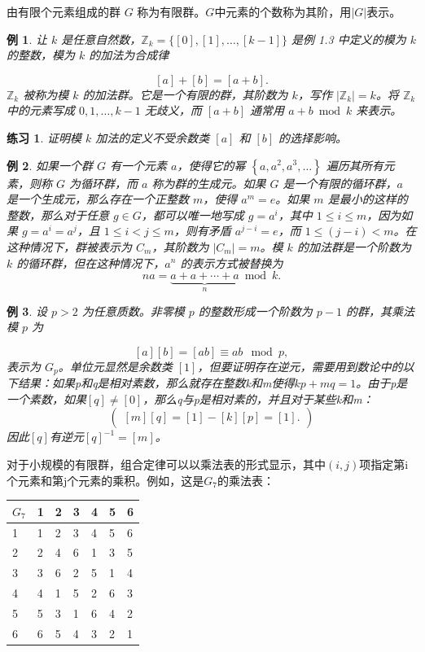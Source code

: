 \documentclass[hyperref,UTF8]{ctexbook}
\newtheorem{eg}{例}[chapter]
\newtheorem*{exercise}{练习}
\begin{document}
由有限个元素组成的群 $G$ 称为有限群。$G$中元素的个数称为其阶，用$|G|$表示。
\begin{eg}
    让 $k$ 是任意自然数，$\mathbb{Z}_k=\{[0],[1],\ldots,[k-1]\}$ 是例 1.3 中定义的模为 $k$ 的整数，模为 $k$ 的加法为合成律

$$
[a]+[b]=[a+b] .
$$
$\mathbb{Z}_k$ 被称为模 $k$ 的加法群。它是一个有限的群，其阶数为 $k$，写作 $\left|\mathbb{Z}_k\right|=k$。将 $\mathbb{Z}_k$ 中的元素写成 $0,1, \ldots, k-1$ 无歧义，而 $[a+b]$ 通常用 $a+b \bmod k$ 来表示。
\end{eg}
\begin{exercise}
    证明模 $k$ 加法的定义不受余数类 $[a]$ 和 $[b]$ 的选择影响。
\end{exercise}
\begin{eg}
 如果一个群 $G$ 有一个元素 $a$，使得它的幂 $\left\{a, a^2, a^3, \ldots\right\}$ 遍历其所有元素，则称 $G$ 为循环群，而 $a$ 称为群的生成元。如果 $G$ 是一个有限的循环群，$a$ 是一个生成元，那么存在一个正整数 $m$，使得 $a^m=e$。如果 $m$ 是最小的这样的整数，那么对于任意 $g \in G$，都可以唯一地写成 $g=a^i$，其中 $1 \leq i \leq m$，因为如果 $g=a^i=a^j$，且 $1 \leq i<j \leq m$，则有矛盾 $a^{j-i}=e$，而 $1 \leq(j-i)<m$。在这种情况下，群被表示为 $C_m$，其阶数为 $\left|C_m\right|=m$。模 $k$ 的加法群是一个阶数为 $k$ 的循环群，但在这种情况下，$a^n$ 的表示方式被替换为
$$
n a=\underbrace{a+a+\cdots+a}_{n} \bmod k .
$$ 
\end{eg}
\begin{eg}
    设 $p>2$ 为任意质数。非零模 $p$ 的整数形成一个阶数为 $p-1$ 的群，其乘法模 $p$ 为

$$
[a][b]=[ab]\equiv ab\mod p,
$$
表示为 $G_p$。单位元显然是余数类 $[1]$，但要证明存在逆元，需要用到数论中的以下结果：如果p和q是相对素数，那么就存在整数k和m使得$k p+m q=1$。由于p是一个素数，如果$[q] \neq[0]$，那么q与p是相对素的，并且对于某些k和m：
$$
\begin{pmatrix}
[m][q]=[1]-[k][p]=[1] .
\end{pmatrix}
$$
因此$[q]$有逆元$[q]^{-1}=[m]$。
\end{eg} 
对于小规模的有限群，组合定律可以以乘法表的形式显示，其中$(i, j)$项指定第i个元素和第j个元素的乘积。例如，这是$G_7$的乘法表：

\begin{tabular}{l|llllll}
$G_7$ & 1 & 2 & 3 & 4 & 5 & 6 \\
\hline 1 & 1 & 2 & 3 & 4 & 5 & 6 \\
2 & 2 & 4 & 6 & 1 & 3 & 5 \\
3 & 3 & 6 & 2 & 5 & 1 & 4 \\
4 & 4 & 1 & 5 & 2 & 6 & 3 \\
5 & 5 & 3 & 1 & 6 & 4 & 2 \\
6 & 6 & 5 & 4 & 3 & 2 & 1
\end{tabular}
\end{document}
